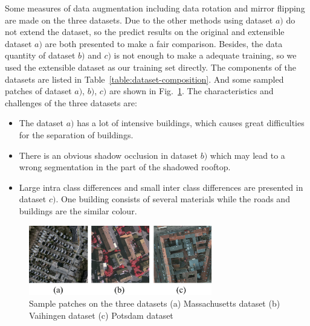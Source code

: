 Some measures of data augmentation including data rotation and mirror flipping are made on the three datasets.
Due to the other methods using dataset ${a)}$ do not extend the dataset, so the predict results on the original and extensible dataset $a)$ are both presented to make a fair comparison.
Besides, the data quantity of dataset ${b)}$ and ${c)}$ is not enough to make a adequate training, so we used the extensible dataset as our training set directly.
The components of the datasets are listed in Table~\ref{table:dataset-composition}.
And some sampled patches of dataset ${a)}$, ${b)}$, ${c)}$ are shown in Fig.~\ref{fig:dataset_sample}.
The characteristics and challenges of the three datasets are:
\begin{itemize}
 \item The dataset ${a)}$ has a lot of intensive buildings, which causes great difficulties for the separation of buildings.
 \item There is an obvious shadow occlusion in dataset ${b)}$ which may lead to a wrong segmentation in the part of the shadowed rooftop.
 \item Large intra class differences and small inter class differences are presented in dataset ${c)}$. One building consists of several materials while the roads and buildings are the similar colour. 
\end{itemize}


\begin{figure}
\setlength{\abovecaptionskip}{-0cm}
\setlength{\belowcaptionskip}{-2cm} 
\centering
\includegraphics[width=8cm]{Figures/datasets.eps}
\caption{Sample patches on the three datasets  (a) Massachusetts dataset (b) Vaihingen dataset (c) Potsdam dataset}
\label{fig:dataset_sample}
\end{figure}

